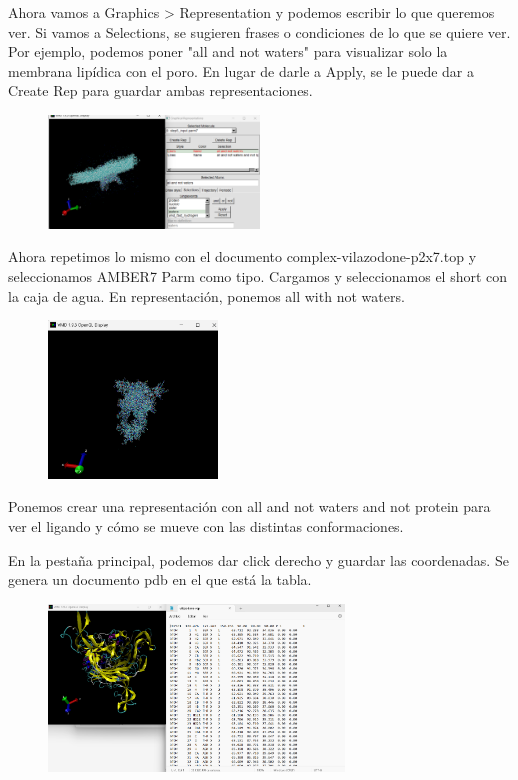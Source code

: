 Ahora vamos a Graphics > Representation y podemos escribir lo que queremos ver. Si vamos a Selections, se sugieren frases o condiciones de lo que se quiere ver. Por ejemplo, podemos poner "all and not waters" para visualizar solo la membrana lipídica con el poro. En lugar de darle a Apply, se le puede dar a Create Rep para guardar ambas representaciones. 

\begin{figure}[h]
\centering
\includegraphics[width = 0.5\textwidth]{figs/lipid-rep.png}
\end{figure}

\newpage

Ahora repetimos lo mismo con el documento complex-vilazodone-p2x7.top y seleccionamos AMBER7 Parm como tipo. Cargamos y seleccionamos el short con la caja de agua. En representación, ponemos all with not waters. 

\begin{figure}[h]
\centering
\includegraphics[width = 0.4\textwidth]{figs/protein-dynamics.png}
\end{figure}

Ponemos crear una representación con all and not waters and not protein para ver el ligando y cómo se mueve con las distintas conformaciones. 

En la pestaña principal, podemos dar click derecho y guardar las coordenadas. Se genera un documento pdb en el que está la tabla.

\begin{figure}[h]
\centering
\includegraphics[width = 0.7\textwidth]{figs/md-tabla.png}
\end{figure}

